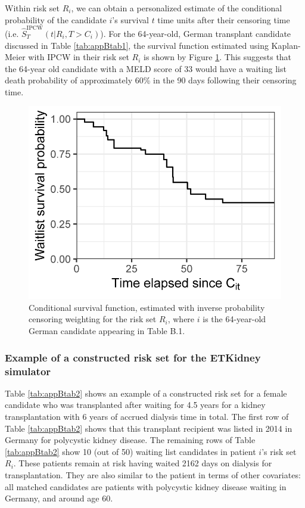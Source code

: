 \documentclass[11pt,twoside,]{book}
\begin{document}
\FloatBarrier

Within risk set \(R_i\), we can obtain a
personalized estimate of the conditional probability of the candidate \(i\)'s
survival \(t\) time units after their censoring time (i.e.
\(\hat{S}^{\text{IPCW}}_T(t|R_i, T > C_i)\)). For the 64-year-old, German
transplant candidate discussed in Table \ref{tab:appBtab1}, the survival function estimated using Kaplan-Meier with IPCW in their risk set \(R_i\) is shown by Figure \ref{fig:chappsfig3}. This suggests that the 64-year old candidate with a MELD score of 33 would
have a waiting list death probability of approximately 60\% in the 90 days following their censoring time.

\begin{figure}[ht]

{\centering \includegraphics[width=0.5\linewidth]{figures/appendix//sfig3-survival_selected_riskset} 

}

\caption{Conditional survival function, estimated with inverse probability censoring weighting for the risk set $R_i$, where $i$ is the 64-year-old German candidate appearing in Table B.1.}\label{fig:chappsfig3}
\end{figure}

\subsubsection*{Example of a constructed risk set for the ETKidney simulator}\label{example-of-a-constructed-risk-set-for-the-etkidney-simulator}

Table \ref{tab:appBtab2} shows an example of a constructed
risk set for a female candidate who was transplanted after waiting for
4.5 years for a kidney transplantation with 6 years of accrued dialysis
time in total. The first row of Table \ref{tab:appBtab2} shows that this
transplant recipient was listed in 2014 in Germany for polycystic kidney disease. The remaining
rows of Table \ref{tab:appBtab2} show 10 (out of 50) waiting list
candidates in patient \(i\)'s risk set \(R_i\). These patients remain at
risk having waited 2162 days on dialysis for transplantation. They are
also similar to the patient in terms of other covariates: all matched
candidates are patients with polycystic kidney disease waiting in
Germany, and around age 60.
\end{document}
